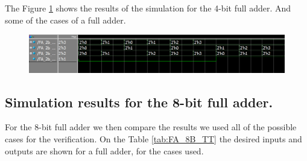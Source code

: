 \documentclass[conference]{IEEEtran}
\begin{document}
	The Figure \ref{fig:fa4bsim} shows the results of the simulation for the 4-bit full adder. And some of the cases of a full adder.
	
	\begin{figure}[H]
		\centering
		\includegraphics[width=0.9\columnwidth]{FA_2B_sim}
		\caption{}
		\label{fig:fa4bsim}
	\end{figure}
	
	\subsection{Simulation results for the 8-bit full adder.}
	
	For the 8-bit full adder we then compare the results we used all of the possible cases for the verification. On the Table \ref{tab:FA_8B_TT} the desired inputs and outputs are shown for a full adder, for the cases used.
	
\end{document}
